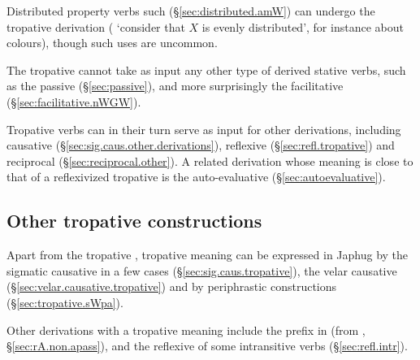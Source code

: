 Distributed property verbs such  (§\ref{sec:distributed.amW}) can undergo the tropative derivation ( `consider that $X$ is evenly distributed', for instance about colours), though such uses are uncommon.

The tropative cannot take as input any other type of derived stative verbs, such as the passive (§\ref{sec:passive}), and more surprisingly the  facilitative (§\ref{sec:facilitative.nWGW}).

Tropative verbs can in their turn serve as input for other derivations, including causative (§\ref{sec:sig.caus.other.derivations}), reflexive (§\ref{sec:refl.tropative}) and reciprocal (§\ref{sec:reciprocal.other}). A related derivation whose meaning is close to that of a reflexivized tropative is the auto-eva\-lua\-tive  (§\ref{sec:autoevaluative}).

\subsection{Other tropative constructions}  \label{sec:tropative.other.construction}
Apart from the tropative , tropative meaning can be expressed in Japhug by the sigmatic causative in a few cases (§\ref{sec:sig.caus.tropative}), the velar causative (§\ref{sec:velar.causative.tropative}) and by periphrastic constructions (§\ref{sec:tropative.sWpa}). 

Other derivations with a tropative meaning include the  prefix in  (from , §\ref{sec:rA.non.apass}), and the reflexive   of some intransitive verbs (§\ref{sec:refl.intr}).
